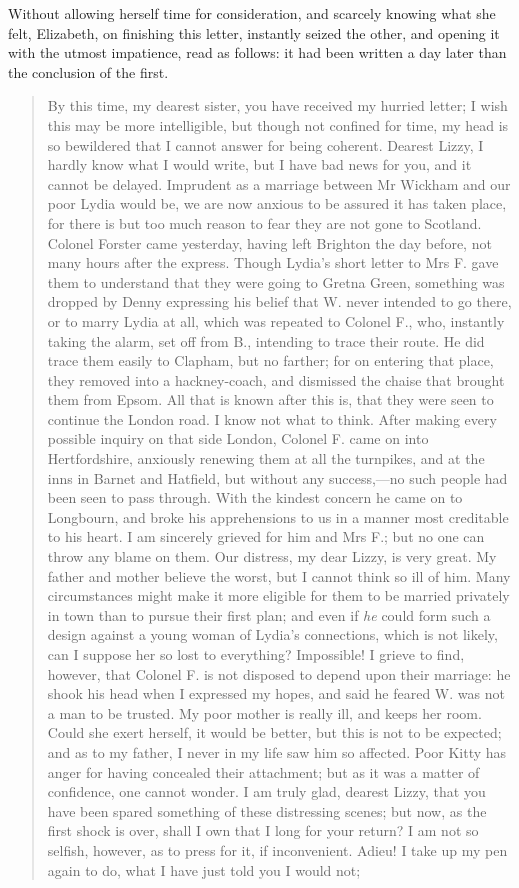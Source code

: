 Without allowing herself time for consideration, and scarcely knowing what she felt, Elizabeth, on finishing this letter, instantly seized the other, and opening it with the utmost impatience, read as follows: it had been written a day later than the conclusion of the first.


\begin{quotation}
\indent By this time, my dearest sister, you have received my hurried letter; I wish this may be more intelligible, but though not confined for time, my head is so bewildered that I cannot answer for being coherent. Dearest Lizzy, I hardly know what I would write, but I have bad news for you, and it cannot be delayed. Imprudent as a marriage between Mr Wickham and our poor Lydia would be, we are now anxious to be assured it has taken place, for there is but too much reason to fear they are not gone to Scotland. Colonel Forster came yesterday, having left Brighton the day before, not many hours after the express. Though Lydia's short letter to Mrs F. gave them to understand that they were going to Gretna Green, something was dropped by Denny expressing his belief that W. never intended to go there, or to marry Lydia at all, which was repeated to Colonel F., who, instantly taking the alarm, set off from B., intending to trace their route. He did trace them easily to Clapham, but no farther; for on entering that place, they removed into a hackney-coach, and dismissed the chaise that brought them from Epsom. All that is known after this is, that they were seen to continue the London road. I know not what to think. After making every possible inquiry on that side London, Colonel F. came on into Hertfordshire, anxiously renewing them at all the turnpikes, and at the inns in Barnet and Hatfield, but without any success,—no such people had been seen to pass through. With the kindest concern he came on to Longbourn, and broke his apprehensions to us in a manner most creditable to his heart. I am sincerely grieved for him and Mrs F.; but no one can throw any blame on them. Our distress, my dear Lizzy, is very great. My father and mother believe the worst, but I cannot think so ill of him. Many circumstances might make it more eligible for them to be married privately in town than to pursue their first plan; and even if \textit{he} could form such a design against a young woman of Lydia's connections, which is not likely, can I suppose her so lost to everything? Impossible! I grieve to find, however, that Colonel F. is not disposed to depend upon their marriage: he shook his head when I expressed my hopes, and said he feared W. was not a man to be trusted. My poor mother is really ill, and keeps her room. Could she exert herself, it would be better, but this is not to be expected; and as to my father, I never in my life saw him so affected. Poor Kitty has anger for having concealed their attachment; but as it was a matter of confidence, one cannot wonder. I am truly glad, dearest Lizzy, that you have been spared something of these distressing scenes; but now, as the first shock is over, shall I own that I long for your return? I am not so selfish, however, as to press for it, if inconvenient. Adieu! I take up my pen again to do, what I have just told you I would not; 
\end{quotation}
